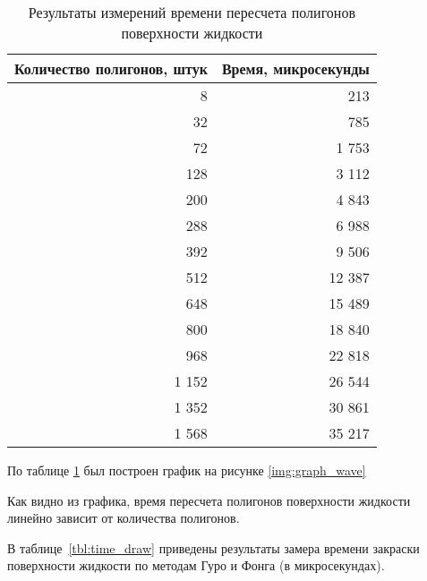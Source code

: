 \begin{table}[H]
\caption{\label{tbl:time}Результаты измерений времени пересчета полигонов поверхности жидкости}
\centering
\begin{tabular}{|r|r|}
\hline
Количество полигонов, штук & Время, микросекунды \\ \hline
8    &    213 \\ \hline
32   &    785 \\ \hline
72   &  1 753 \\ \hline
128  &  3 112 \\ \hline
200  &  4 843 \\ \hline
288  &  6 988 \\ \hline
392  &  9 506 \\ \hline
512  &  12 387 \\ \hline
648  &  15 489 \\ \hline
800  &  18 840 \\ \hline
968  &  22 818 \\ \hline
1 152 &  26 544 \\ \hline
1 352 &  30 861 \\ \hline
1 568 &  35 217 \\ \hline
\end{tabular}
\end{table}

По таблице \ref{tbl:time} был построен график на рисунке \ref{img:graph_wave}


\newpage

Как видно из графика, время пересчета полигонов поверхности жидкости линейно зависит от количества полигонов.

В таблице~\ref{tbl:time_draw} приведены результаты замера времени закраски поверхности жидкости по методам Гуро и Фонга (в микросекундах). 

